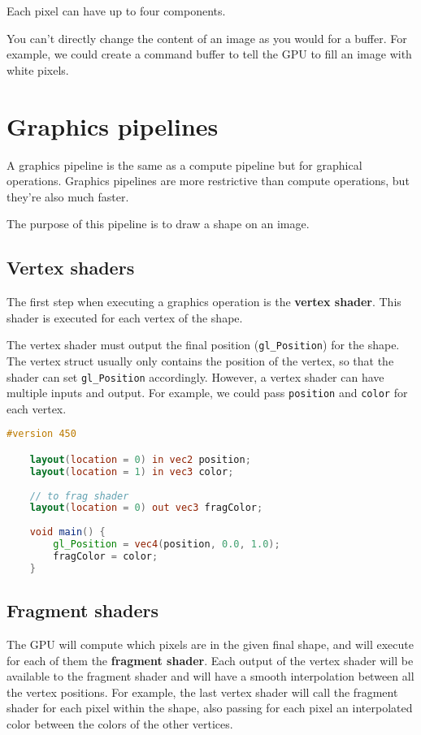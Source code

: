 \documentclass{article}
\begin{document}
Each pixel can have up to four components.

You can't directly change the content of an image as you would for a buffer.
For example, we could create a command buffer to tell the GPU to fill an image with white pixels.

\section{Graphics pipelines}

A graphics pipeline is the same as a compute pipeline but for graphical operations.
Graphics pipelines are more restrictive than compute operations, but they're also much faster.

The purpose of this pipeline is to draw a shape on an image.

\subsection{Vertex shaders}

The first step when executing a graphics operation is the \textbf{vertex shader}.
This shader is executed for each vertex of the shape.

The vertex shader must output the final position (\texttt{gl\_Position}) for the shape.
The vertex struct usually only contains the position of the vertex, so that the shader
can set \texttt{gl\_Position} accordingly. However, a vertex shader can have multiple inputs and output.
For example, we could pass \texttt{position} and \texttt{color} for each vertex.

\begin{lstlisting}[language=GLSL, caption={Vertex Shader}]
    #version 450

    layout(location = 0) in vec2 position;
    layout(location = 1) in vec3 color;
    
    // to frag shader
    layout(location = 0) out vec3 fragColor;
    
    void main() {
        gl_Position = vec4(position, 0.0, 1.0);
        fragColor = color;
    }
\end{lstlisting}

\subsection{Fragment shaders}

The GPU will compute which pixels are in the given final shape, and
will execute for each of them the \textbf{fragment shader}.
Each output of the vertex shader will be available to the fragment shader
and will have a smooth interpolation between all the vertex positions.
For example, the last vertex shader will call the fragment shader
for each pixel within the shape, also passing for each pixel
an interpolated color between the colors of the other vertices.
\end{document}

